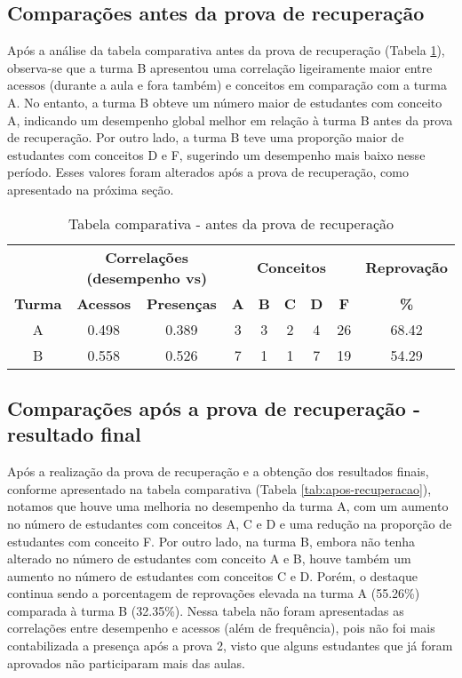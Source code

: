 \subsection{Comparações antes da prova de recuperação}

Após a análise da tabela comparativa antes da prova de recuperação (Tabela \ref{tab:antes-recuperacao}), observa-se que a turma B apresentou uma correlação ligeiramente maior entre acessos (durante a aula e fora também) e conceitos em comparação com a turma A. No entanto, a turma B obteve um número maior de estudantes com conceito A, indicando um desempenho global melhor em relação à turma B antes da prova de recuperação. Por outro lado, a turma B teve uma proporção maior de estudantes com conceitos D e F, sugerindo um desempenho mais baixo nesse período. Esses valores foram alterados após a prova de recuperação, como apresentado na próxima seção.

\begin{table}[htbp]
    \centering
    \caption{Tabela comparativa - antes da prova de recuperação}
    \label{tab:antes-recuperacao}
    \begin{tabular}{|c|c|c|c|c|c|c|c|c|}
      \hline
      \rowcolor[HTML]{EFEFEF} 
      & \multicolumn{2}{c|}{\cellcolor[HTML]{C0C0C0}\textbf{Correlações (desempenho vs)}} & \multicolumn{5}{c|}{\cellcolor[HTML]{C0C0C0}\textbf{Conceitos}} & \cellcolor[HTML]{C0C0C0}\textbf{Reprovação} \\
      \cline{2-3} \cline{4-8} \cline{9-9}
      \rowcolor[HTML]{EFEFEF} 
      \textbf{Turma} & \textbf{Acessos} & \textbf{Presenças} & \textbf{A} & \textbf{B} & \textbf{C} & \textbf{D} & \textbf{F} & \textbf{\%} \\
      \hline
      A & 0.498 & 0.389 & 3 & 3 & 2 & 4 & 26 & 68.42 \\
      \hline
      B & 0.558 & 0.526 & 7 & 1 & 1 & 7 & 19 & 54.29 \\
      \hline
    \end{tabular}
\end{table}

\subsection{Comparações após a prova de recuperação - resultado final}


Após a realização da prova de recuperação e a obtenção dos resultados finais, conforme apresentado na tabela comparativa (Tabela \ref{tab:apos-recuperacao}), notamos que houve uma melhoria no desempenho da turma A, com um aumento no número de estudantes com conceitos A, C e D e uma redução na proporção de estudantes com conceito F. Por outro lado, na turma B, embora não tenha alterado no número de estudantes com conceito A e B, houve também um aumento no número de estudantes com conceitos C e D. Porém, o destaque continua sendo a porcentagem de reprovações elevada na turma A (55.26\%) comparada à turma B (32.35\%). Nessa tabela não foram apresentadas as correlações entre desempenho e acessos (além de frequência), pois não foi mais contabilizada a presença após a prova 2, visto que alguns estudantes que já foram aprovados não participaram mais das aulas.

